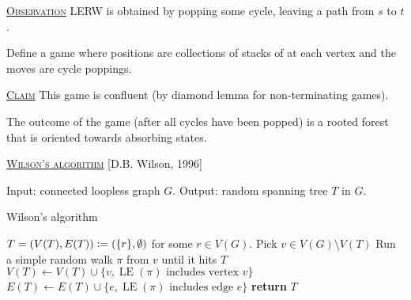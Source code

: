 \documentclass{report}
\def \LE {\operatorname{LE}}
\newcommand{\defeq}{\vcentcolon=}
\newcommand{\fancyem}[1]{\underline{\textsc{#1}}}
\theoremstyle{definition}
\theoremstyle{remark}
\numberwithin{equation}{section}
\begin{document}
\fancyem{Observation} LERW is obtained by popping some cycle, leaving a path from $s$ to $t$.

Define a game where positions are collections of stacks of at each vertex and the moves are cycle poppings.

\fancyem{Claim} This game is confluent (by diamond lemma for non-terminating games).

The outcome of the game (after all cycles have been popped) is a rooted forest that is oriented towards absorbing states.

\fancyem{Wilson's algorithm} [D.B. Wilson, 1996]

Input: connected loopless graph $G$.
Output: random spanning tree $T$ in $G$.

\begin{algorithm}[h]
    \caption{Wilson's algorithm}
    \label{algo:wilson}
    \begin{algorithmic}[1]
            \State $T = (V(T), E(T)) \defeq (\{r\}, \emptyset)$ for some $r \in V(G)$.
             
                \State Pick $v \in V(G) \setminus V(T)$
                \State Run a simple random walk $\pi$ from $v$ until it hits $T$
                \State $V(T) \gets V(T) \cup \{v, \LE(\pi) \text{ includes vertex } v\}$
                \State $E(T) \gets E(T) \cup \{e, \LE(\pi) \text{ includes edge } e\}$
            \EndWhile
            \State \textbf{return} $T$
        \EndFunction
    \end{algorithmic}
\end{algorithm}
\end{document}
